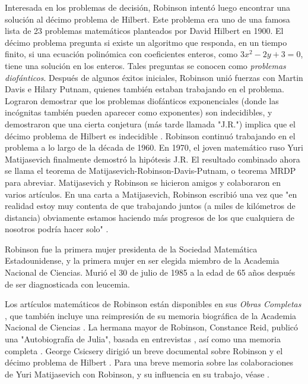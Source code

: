 \documentclass[../../../include/open-logic-section]{subfiles}
\begin{document}
Interesada en los problemas de decisión, Robinson intentó luego encontrar una solución al décimo problema de Hilbert. Este problema era uno de una famosa lista de 23 problemas matemáticos planteados por David Hilbert en 1900. El décimo problema pregunta si existe un algoritmo que responda, en un tiempo finito, si una ecuación polinómica con coeficientes enteros, como $3x^2 - 2y + 3 = 0$, tiene una solución en los enteros. Tales preguntas se conocen como \emph{problemas diofánticos}. Después de algunos éxitos iniciales, Robinson unió fuerzas con Martin Davis e Hilary Putnam, quienes también estaban trabajando en el problema. Lograron demostrar que los problemas diofánticos exponenciales (donde las incógnitas también pueden aparecer como exponentes) son indecidibles, y demostraron que una cierta conjetura (más tarde llamada "J.R.") implica que el décimo problema de Hilbert es indecidible \citep{DavisPutnamRobinson1961}. Robinson continuó trabajando en el problema a lo largo de la década de 1960. En 1970, el joven matemático ruso Yuri Matijasevich finalmente demostró la hipótesis J.R. El resultado combinado ahora se llama el teorema de Matijasevich-Robinson-Davis-Putnam, o teorema MRDP para abreviar. Matijasevich y Robinson se hicieron amigos y colaboraron en varios artículos. En una carta a Matijasevich, Robinson escribió una vez que "en realidad estoy muy contenta de que trabajando juntos (a miles de kilómetros de distancia) obviamente estamos haciendo más progresos de los que cualquiera de nosotros podría hacer solo" \citep[45]{Matijasevich1992}.

Robinson fue la primera mujer presidenta de la Sociedad Matemática Estadounidense, y la primera mujer en ser elegida miembro de la Academia Nacional de Ciencias. Murió el 30 de julio de 1985 a la edad de 65 años después de ser diagnosticada con leucemia.

\begin{reading}
Los artículos matemáticos de Robinson están disponibles en sus \textit{Obras Completas} \citep{Robinson1996}, que también incluye una reimpresión de su memoria biográfica de la Academia Nacional de Ciencias \citep{Feferman1994}. La hermana mayor de Robinson, Constance Reid, publicó una "Autobiografía de Julia", basada en entrevistas \citep{Reid1986}, así como una memoria completa \citep{Reid1996}. George Csicsery dirigió un breve documental sobre Robinson y el décimo problema de Hilbert \citep{Csicsery2016}. Para una breve memoria sobre las colaboraciones de Yuri Matijasevich con Robinson, y su influencia en su trabajo, véase \citep{Matijasevich1992}.
\end{reading}
\end{document}
